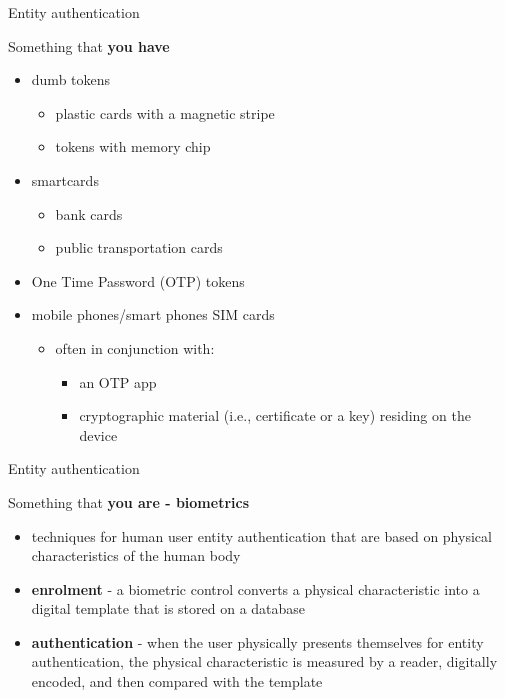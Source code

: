 \documentclass[pdf]{beamer}
\begin{document}
\begin{frame}{Entity authentication}

Something that \textbf{you have}

\begin{itemize}
\item
dumb tokens

\begin{itemize}
\item
plastic cards with a magnetic stripe

\item
tokens with memory chip
\end{itemize}

\item
smartcards

\begin{itemize}
\item
bank cards

\item
public transportation cards
\end{itemize}

\item
One Time Password (OTP) tokens

\item
mobile phones/smart phones SIM cards

\begin{itemize}
\item
often in conjunction with:
\begin{itemize}
\item
an OTP app 
\item
cryptographic material (i.e., certificate or a key) residing on the device
\end{itemize}
\end{itemize}

\end{itemize}
\end{frame}



\begin{frame}{Entity authentication}

Something that \textbf{you are - biometrics}

\begin{itemize}
\item
techniques for human user entity authentication that are based on physical characteristics of the human body
\newline

\item
\textbf{enrolment} - a biometric control converts a physical characteristic into a digital template that is stored on a database
\item
\textbf{authentication} - when the user physically presents themselves for entity authentication, the physical characteristic is measured by a reader, digitally encoded, and then compared with the template
\end{itemize}
\end{frame}
\end{document}
